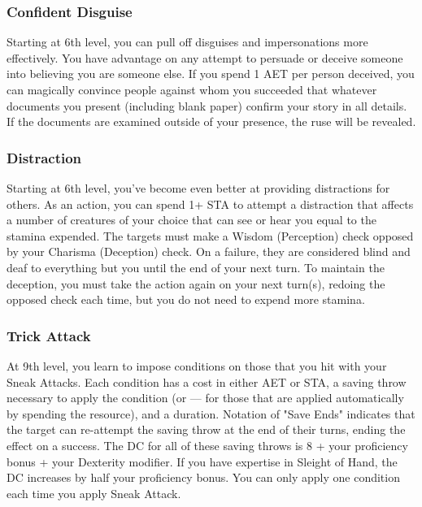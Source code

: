 	\subsubsection{Confident Disguise}
	Starting at 6th level, you can pull off disguises and impersonations more effectively. You have advantage on any attempt to persuade or deceive someone into believing you are someone else. If you spend 1 AET per person deceived, you can magically convince people against whom you succeeded that whatever documents you present (including blank paper) confirm your story in all details. If the documents are examined outside of your presence, the ruse will be revealed.

	\subsubsection{Distraction}
	Starting at 6th level, you've become even better at providing distractions for others. As an action, you can spend 1+ STA to attempt a distraction that affects a number of creatures of your choice that can see or hear you equal to the stamina expended. The targets must make a Wisdom (Perception) check opposed by your Charisma (Deception) check. On a failure, they are considered blind and deaf to everything but you until the end of your next turn. To maintain the deception, you must take the action again on your next turn(s), redoing the opposed check each time, but you do not need to expend more stamina.

	\subsubsection{Trick Attack}
	At 9th level, you learn to impose conditions on those that you hit with your Sneak Attacks. Each condition has a cost in either AET or STA, a saving throw necessary to apply the condition (or --- for those that are applied automatically by spending the resource), and a duration. Notation of "Save Ends" indicates that the target can re-attempt the saving throw at the end of their turns, ending the effect on a success. The DC for all of these saving throws is 8 + your proficiency bonus + your Dexterity modifier. If you have expertise in Sleight of Hand, the DC increases by half your proficiency bonus. You can only apply one condition each time you apply Sneak Attack.

